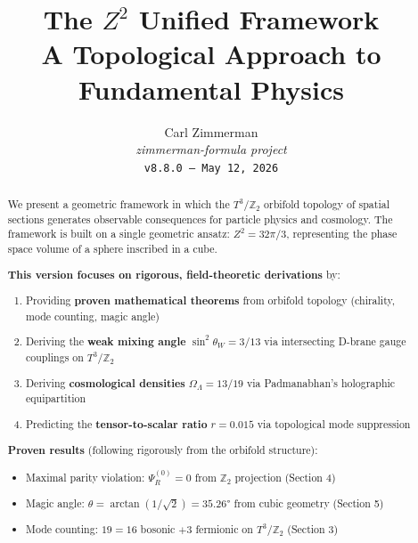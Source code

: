 \documentclass[12pt,a4paper]{article}
\newcommand{\Ztwo}{\mathbb{Z}_2}
\newcommand{\Tthree}{T^3}
\newcommand{\OmegaL}{\Omega_\Lambda}
\newcommand{\sinW}{\sin^2\theta_W}
\newcommand{\Zsq}{Z^2}
\begin{document}
\title{\textbf{The $Z^2$ Unified Framework}\\[0.5em]
\large A Topological Approach to Fundamental Physics}

\author{Carl Zimmerman\\[0.5em]
\small\textit{zimmerman-formula project}\\
\small\texttt{v8.8.0 --- May 12, 2026}}

\date{}

\maketitle

\begin{abstract}

We present a geometric framework in which the $\Tthree/\Ztwo$ orbifold topology of spatial sections generates observable consequences for particle physics and cosmology. The framework is built on a single geometric ansatz: $\Zsq = 32\pi/3$, representing the phase space volume of a sphere inscribed in a cube.

\textbf{This version focuses on rigorous, field-theoretic derivations} by:
\begin{enumerate}[itemsep=0pt]
    \item Providing \textbf{proven mathematical theorems} from orbifold topology (chirality, mode counting, magic angle)
    \item Deriving the \textbf{weak mixing angle} $\sinW = 3/13$ via intersecting D-brane gauge couplings on $\Tthree/\Ztwo$
    \item Deriving \textbf{cosmological densities} $\OmegaL = 13/19$ via Padmanabhan's holographic equipartition
    \item Predicting the \textbf{tensor-to-scalar ratio} $r = 0.015$ via topological mode suppression
\end{enumerate}

\textbf{Proven results} (following rigorously from the orbifold structure):
\begin{itemize}[itemsep=0pt]
    \item Maximal parity violation: $\Psi_R^{(0)} = 0$ from $\Ztwo$ projection (Section 4)
    \item Magic angle: $\theta = \arctan(1/\sqrt{2}) = 35.26°$ from cubic geometry (Section 5)
    \item Mode counting: $19 = 16$ bosonic $+ 3$ fermionic on $\Tthree/\Ztwo$ (Section 3)
\end{itemize}


\end{abstract}
\end{document}
